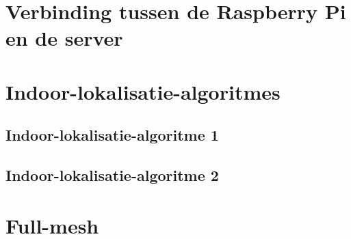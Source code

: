 \section{Verbinding tussen de Raspberry Pi en de server}


\section{Indoor-lokalisatie-algoritmes}
\subsection{Indoor-lokalisatie-algoritme 1}


\subsection{Indoor-lokalisatie-algoritme 2}


\section{Full-mesh}
